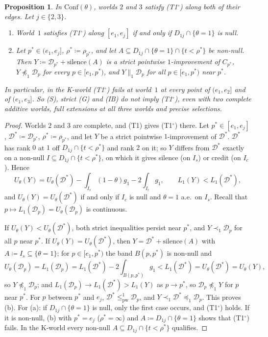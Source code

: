 \documentclass[11pt]{article}
\newtheorem{proposition}[theorem]{Proposition}
\theoremstyle{definition}\newtheorem{definition}[theorem]{Definition}
\theoremstyle{remark}\newtheorem{remark}[theorem]{Remark}
\newcommand{\Dscr}{\mathcal D}
\newcommand{\sil}{\mathrm{silence}}
\newcommand{\pw}{\mathrm{pw}}
\newcommand{\To}{\textup{(T1$^\circ$)}}
\begin{document}
\begin{proposition}\label{prop:confT1}
In $\mathrm{Conf}(\theta)$, worlds $2$ and $3$ satisfy \To{} along both of
their edges. Let $j\in\{2,3\}$.
\begin{enumerate}[label=(\alph*),leftmargin=*,itemsep=2pt]
\item World~$1$ satisfies \To{} along $[e_1,e_j]$ if and only if
$D_{1j}\cap\{\theta=1\}$ is null.
\item Let $p^*\in(e_1,e_j]$, $\rho^*\coloneqq\rho_{p^*}$, and let
$A\subseteq D_{1j}\cap\{\theta=1\}\cap\{t<\rho^*\}$ be non-null. Then
$Y\coloneqq\Dscr_{p^*}+\sil(A)$ is a strict pointwise $1$-improvement of
$C_{p^*}$, $Y\not\preceq_1\Dscr_p$ for every $p\in[e_1,p^*)$, and
$Y\parallel_1\Dscr_p$ for all $p\in[e_1,p^*)$ near $p^*$.
\end{enumerate}
In particular, in the K-world \To{} fails at world~$1$ at every point of
$(e_1,e_2]$ and of $(e_1,e_3]$. So (S), strict (G) and (IB) do not imply
\To{}, even with two complete additive worlds, full extensions at all three
worlds and precise selections.
\end{proposition}
\begin{proof}
Worlds $2$ and $3$ are complete, and (T1) gives \To{} there. Let
$p^*\in[e_1,e_j]$, $\Dscr^*\coloneqq\Dscr_{p^*}$, $\rho^*\coloneqq
\rho_{p^*}$, and let $Y$ be a strict pointwise $1$-improvement of
$\Dscr^*$. $\Dscr^*$ has rank $0$ at $1$ off $D_{1j}\cap\{t<\rho^*\}$ and
rank $2$ on it; so $Y$ differs from $\Dscr^*$ exactly on a non-null
$I\subseteq D_{1j}\cap\{t<\rho^*\}$, on which it gives silence (on $I_s$) or
credit (on $I_c$). Hence
\[
 U_\theta(Y)=U_\theta(\Dscr^*)-\int_{I_s}(1-\theta)g_1-2\int_{I_c}g_1,
 \qquad L_1(Y)<L_1(\Dscr^*),
\]
and $U_\theta(Y)=U_\theta(\Dscr^*)$ if and only if $I_c$ is null and
$\theta=1$ a.e.\ on $I_s$. Recall that $p\mapsto L_1(\Dscr_p)=
U_\theta(\Dscr_p)$ is continuous.

If $U_\theta(Y)<U_\theta(\Dscr^*)$, both strict inequalities persist near
$p^*$, and $Y\prec_1\Dscr_p$ for all $p$ near $p^*$. If
$U_\theta(Y)=U_\theta(\Dscr^*)$, then $Y=\Dscr^*+\sil(A)$ with $A\coloneqq
I_s\subseteq\{\theta=1\}$; for $p\in[e_1,p^*)$ the band $B(p,p^*)$ is
non-null and
\[
 U_\theta(\Dscr_p)=L_1(\Dscr_p)=L_1(\Dscr^*)-2\int_{B(p,p^*)}g_1<
 L_1(\Dscr^*)=U_\theta(\Dscr^*)=U_\theta(Y),
\]
so $Y\not\preceq_1\Dscr_p$; and $L_1(\Dscr_p)\to L_1(\Dscr^*)>L_1(Y)$ as
$p\to p^*$, so $\Dscr_p\not\preceq_1Y$ for $p$ near $p^*$. For $p$ between
$p^*$ and $e_j$, $\Dscr^*\le^1_\pw\Dscr_p$, and $Y\prec_1\Dscr^*
\preceq_1\Dscr_p$. This proves (b). For (a): if $D_{1j}\cap\{\theta=1\}$ is
null, only the first case occurs, and \To{} holds. If it is non-null, (b)
with $p^*=e_j$ ($\rho^*=\infty$) and $A\coloneqq D_{1j}\cap\{\theta=1\}$
shows that \To{} fails. In the K-world every
non-null $A\subseteq D_{1j}\cap\{t<\rho^*\}$ qualifies.
\end{proof}
\end{document}
